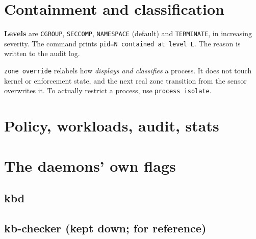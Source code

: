 \section{Containment and classification}
\textbf{Levels} are \texttt{CGROUP}, \texttt{SECCOMP}, \texttt{NAMESPACE} (default) and \texttt{TERMINATE}, in
increasing severity. The command prints \texttt{pid=N contained at level L}. The reason is written to the audit log.
\begin{kbnote}
\texttt{zone override} relabels how  \emph{displays and classifies} a process. It does not touch
kernel or enforcement state, and the next real zone transition from the sensor overwrites it. To actually
restrict a process, use \texttt{process isolate}.
\end{kbnote}

\section{Policy, workloads, audit, stats}

\section{The daemons' own flags}
\subsection{kbd}

\subsection{kb-checker (kept down; for reference)}

